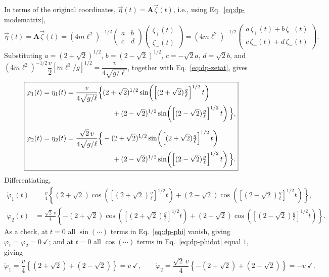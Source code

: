 \documentclass[11pt]{article}
\newcommand{\bA}{\mathbf{A}}
\begin{document}
In terms of the original coordinates, $\vec\eta(t) = \bA\vec\zeta(t)$, i.e., using Eq.~\eqref{eq:dp-modematrix},
\begin{equation}
\vec\eta(t) = \bA\vec\zeta(t) = (4m\ell^2)^{-1/2}\begin{pmatrix}a&b\\c&d\end{pmatrix}\begin{pmatrix}\zeta_+(t)\\\zeta_-(t)\end{pmatrix} = (4m\ell^2)^{-1/2}\begin{pmatrix}a\,\zeta_+(t)+b\,\zeta_-(t)\\c\,\zeta_+(t)+d\,\zeta_-(t)\end{pmatrix}.
\end{equation}
Substituting $a=(2+\sqrt2)^{1/2}$, $b=(2-\sqrt2)^{1/2}$, $c=-\sqrt2 a$, $d=\sqrt2 b$, and $(4m\ell^2)^{-1/2}\dfrac{v}{2}\left[m\ell^3/g\right]^{1/2}=\dfrac{v}{4\sqrt{g/\ell}}$, together with Eq.~\eqref{eq:dp-zetat}, gives
\begin{equation}
\boxed{
\begin{aligned}
\varphi_1(t)=\eta_1(t) &= \frac{v}{4\sqrt{g/\ell}}\Big\{(2+\sqrt2)^{1/2}\sin\!\left(\left[(2+\sqrt2)\tfrac g\ell\right]^{1/2}t\right)\\
&\hspace{2.3cm}+(2-\sqrt2)^{1/2}\sin\!\left(\left[(2-\sqrt2)\tfrac g\ell\right]^{1/2}t\right)\Big\},\\[6pt]
\varphi_2(t)=\eta_2(t) &= \frac{\sqrt2\,v}{4\sqrt{g/\ell}}\Big\{-(2+\sqrt2)^{1/2}\sin\!\left(\left[(2+\sqrt2)\tfrac g\ell\right]^{1/2}t\right)\\
&\hspace{2.3cm}+(2-\sqrt2)^{1/2}\sin\!\left(\left[(2-\sqrt2)\tfrac g\ell\right]^{1/2}t\right)\Big\}.
\end{aligned}}
\label{eq:dp-phi}
\end{equation}
Differentiating,
\begin{equation}
\begin{aligned}
\dot\varphi_1(t) &= \frac{v}{4}\left\{(2+\sqrt2)\cos\!\left(\left[(2+\sqrt2)\tfrac g\ell\right]^{1/2}t\right)+(2-\sqrt2)\cos\!\left(\left[(2-\sqrt2)\tfrac g\ell\right]^{1/2}t\right)\right\},\\
\dot\varphi_2(t) &= \frac{\sqrt2\,v}{4}\left\{-(2+\sqrt2)\cos\!\left(\left[(2+\sqrt2)\tfrac g\ell\right]^{1/2}t\right)+(2-\sqrt2)\cos\!\left(\left[(2-\sqrt2)\tfrac g\ell\right]^{1/2}t\right)\right\}.
\end{aligned}
\label{eq:dp-phidot}
\end{equation}
As a check, at $t=0$ all $\sin(\cdots)$ terms in Eq.~\eqref{eq:dp-phi} vanish, giving $\varphi_1=\varphi_2=0\ \checkmark$; and at $t=0$ all $\cos(\cdots)$ terms in Eq.~\eqref{eq:dp-phidot} equal $1$, giving
\begin{equation}
\dot\varphi_1 = \frac{v}{4}\left\{(2+\sqrt2)+(2-\sqrt2)\right\}=v\ \checkmark, \qquad
\dot\varphi_2 = \frac{\sqrt2\,v}{4}\left\{-(2+\sqrt2)+(2-\sqrt2)\right\}=-v\ \checkmark.
\end{equation}
\end{document}
